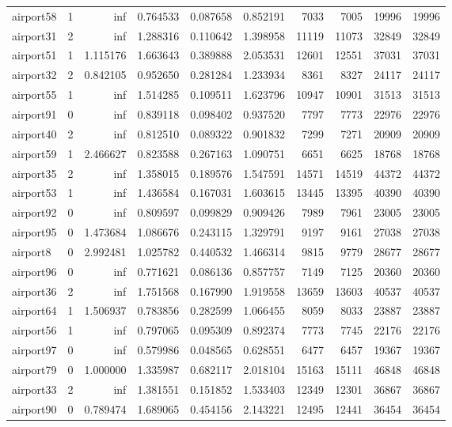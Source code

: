 \begin{longtable}{|l|r|r|r|r|r|r|r|r|r|}
airport58 & 1 & inf & 0.764533 & 0.087658 & 0.852191 & 7033 & 7005 & 19996 & 19996 \\
airport31 & 2 & inf & 1.288316 & 0.110642 & 1.398958 & 11119 & 11073 & 32849 & 32849 \\
airport51 & 1 & 1.115176 & 1.663643 & 0.389888 & 2.053531 & 12601 & 12551 & 37031 & 37031 \\
airport32 & 2 & 0.842105 & 0.952650 & 0.281284 & 1.233934 & 8361 & 8327 & 24117 & 24117 \\
airport55 & 1 & inf & 1.514285 & 0.109511 & 1.623796 & 10947 & 10901 & 31513 & 31513 \\
airport91 & 0 & inf & 0.839118 & 0.098402 & 0.937520 & 7797 & 7773 & 22976 & 22976 \\
airport40 & 2 & inf & 0.812510 & 0.089322 & 0.901832 & 7299 & 7271 & 20909 & 20909 \\
airport59 & 1 & 2.466627 & 0.823588 & 0.267163 & 1.090751 & 6651 & 6625 & 18768 & 18768 \\
airport35 & 2 & inf & 1.358015 & 0.189576 & 1.547591 & 14571 & 14519 & 44372 & 44372 \\
airport53 & 1 & inf & 1.436584 & 0.167031 & 1.603615 & 13445 & 13395 & 40390 & 40390 \\
airport92 & 0 & inf & 0.809597 & 0.099829 & 0.909426 & 7989 & 7961 & 23005 & 23005 \\
airport95 & 0 & 1.473684 & 1.086676 & 0.243115 & 1.329791 & 9197 & 9161 & 27038 & 27038 \\
airport8 & 0 & 2.992481 & 1.025782 & 0.440532 & 1.466314 & 9815 & 9779 & 28677 & 28677 \\
airport96 & 0 & inf & 0.771621 & 0.086136 & 0.857757 & 7149 & 7125 & 20360 & 20360 \\
airport36 & 2 & inf & 1.751568 & 0.167990 & 1.919558 & 13659 & 13603 & 40537 & 40537 \\
airport64 & 1 & 1.506937 & 0.783856 & 0.282599 & 1.066455 & 8059 & 8033 & 23887 & 23887 \\
airport56 & 1 & inf & 0.797065 & 0.095309 & 0.892374 & 7773 & 7745 & 22176 & 22176 \\
airport97 & 0 & inf & 0.579986 & 0.048565 & 0.628551 & 6477 & 6457 & 19367 & 19367 \\
airport79 & 0 & 1.000000 & 1.335987 & 0.682117 & 2.018104 & 15163 & 15111 & 46848 & 46848 \\
airport33 & 2 & inf & 1.381551 & 0.151852 & 1.533403 & 12349 & 12301 & 36867 & 36867 \\
airport90 & 0 & 0.789474 & 1.689065 & 0.454156 & 2.143221 & 12495 & 12441 & 36454 & 36454 \\

\end{longtable}
